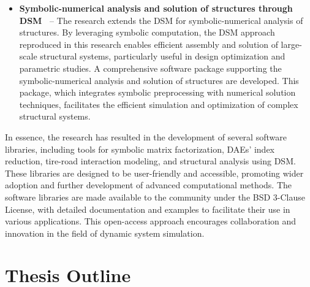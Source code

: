 \begin{itemize}
  \item \textbf{Symbolic-numerical analysis and solution of structures through \ac{DSM}~\cite{trussme, stocco2024trussme, larcher2024imece_symbolic}} -- The research extends the \ac{DSM} for symbolic-numerical analysis of structures. By leveraging symbolic computation, the \ac{DSM} approach reproduced in this research enables efficient assembly and solution of large-scale structural systems, particularly useful in design optimization and parametric studies. A comprehensive software package supporting the symbolic-numerical analysis and solution of structures are developed. This package, which integrates symbolic preprocessing with numerical solution techniques, facilitates the efficient simulation and optimization of complex structural systems.
\end{itemize}
%
In essence, the research has resulted in the development of several software libraries, including tools for symbolic matrix factorization, \acp{DAE}' index reduction, tire-road interaction modeling, and structural analysis using DSM. These libraries are designed to be user-friendly and accessible, promoting wider adoption and further development of advanced computational methods. The software libraries are made available to the community under the \ac{BSD} 3-Clause License, with detailed documentation and examples to facilitate their use in various applications. This open-access approach encourages collaboration and innovation in the field of dynamic system simulation.


\section{Thesis Outline}

